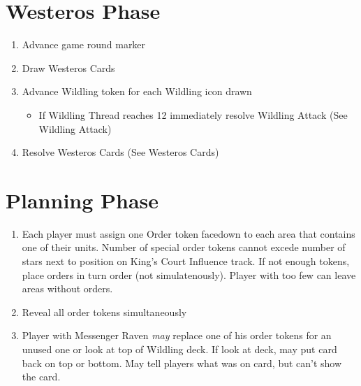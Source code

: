 \documentclass[10pt]{article}
\newenvironment{enumerateCustom}
{\begin{enumerate}
  \setlength{\itemsep}{1pt}
  \setlength{\parskip}{0pt}
  \setlength{\parsep}{0pt}}
{\end{enumerate}}
\newenvironment{itemizeCustom}
{\begin{itemize}
  \setlength{\itemsep}{1pt}
  \setlength{\parskip}{0pt}
  \setlength{\parsep}{0pt}}
{\end{itemize}}
\begin{document}
\begin{multicols*}{2}
\section*{Westeros Phase}
\begin{enumerateCustom}
	\item Advance game round marker
	\item Draw Westeros Cards
	\item Advance Wildling token for each Wildling icon drawn 
	\begin{itemizeCustom}
		\item If Wildling Thread reaches 12 immediately resolve Wildling Attack (See Wildling Attack)
	\end{itemizeCustom}
	\item Resolve Westeros Cards (See Westeros Cards)
\end{enumerateCustom}

\section*{Planning Phase}
\begin{enumerateCustom}
	\item Each player must assign one Order token facedown to each area that contains one of their units. Number of special order tokens cannot excede number of stars next to position on King's Court Influence track. If not enough tokens, place orders in turn order (not simulatenously). Player with too few can leave areas without orders.
	\item Reveal all order tokens simultaneously
	\item Player with Messenger Raven \emph{may} replace one of his order tokens for an unused one or look at top of Wildling deck. If look at deck, may put card back on top or bottom. May tell players what was on card, but can't show the card.
\end{enumerateCustom}


\end{multicols*}
\end{document}
